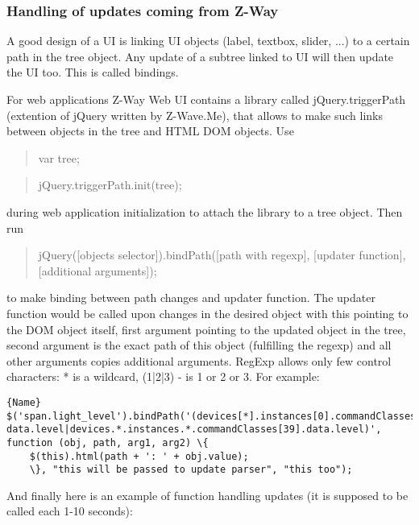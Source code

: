 \subsubsection{Handling of updates coming from Z-Way}

A good design of a UI is linking UI objects (label, textbox, slider, ...) to a certain path in the 
tree object. Any update of a subtree linked to UI will then update the UI too. This is called bindings.

For web applications Z-Way Web UI contains a library called jQuery.triggerPath (extention of jQuery written by 
Z-Wave.Me), that allows to make such links between objects in the tree and HTML DOM objects. Use

\begin{quote}var tree;\end{quote}
\begin{quote}jQuery.triggerPath.init(tree);\end{quote}

during web application initialization to attach the library to a tree object. Then run

\begin{quote}jQuery([objects selector]).bindPath([path with regexp], [updater function], [additional arguments]);\end{quote}

to make binding between path changes and updater function. The updater function would be called upon changes in 
the desired object with this pointing to the DOM object itself, first argument pointing to the updated object 
in the tree, second argument is the exact path of this object (fulfilling the regexp) and all other arguments 
copies additional arguments. RegExp allows only few control characters: * is a wildcard, (1|2|3) - is 1 or 
2 or 3. For example:

\begin{lstlisting}[caption=Subscription of Data Values]{Name}
$('span.light_level').bindPath('(devices[*].instances[0].commandClasses[38].
data.level|devices.*.instances.*.commandClasses[39].data.level)', 
function (obj, path, arg1, arg2) \{
	$(this).html(path + ': ' + obj.value);
	\}, "this will be passed to update parser", "this too");
\end{lstlisting}
And finally here is an example of function handling updates (it is supposed to be called each 1-10 seconds):

